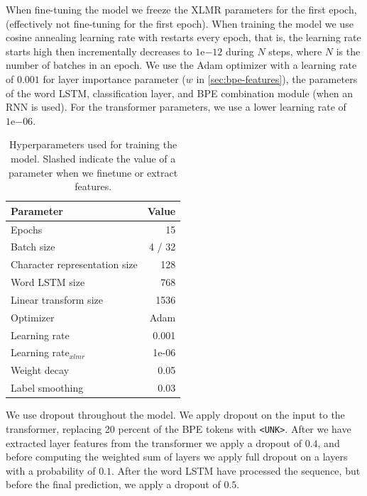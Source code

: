 \documentclass[11pt]{article}
\begin{document}
     When fine-tuning the model we freeze the XLMR parameters for the
     first epoch, (effectively not fine-tuning for the first epoch).
     When training the model we use cosine annealing learning rate
     with restarts every epoch, that is, the learning rate starts high
     then incrementally decreases to $1\mathrm{e}{-12}$ during $N$
     steps, where $N$ is the number of batches in an epoch. We use the
     Adam optimizer with a learning rate of $0.001$ for layer
     importance parameter ($w$ in \cref{sec:bpe-features}), the
     parameters of the word LSTM, classification layer, and BPE
     combination module (when an RNN is used). For the transformer
     parameters, we use a lower learning rate of $1\mathrm{e}{-06}$.

	\begin{table}%
		\centering
		\begin{tabular}{lr}
			Parameter & Value \\
			\hline
			Epochs & 15 \\
			Batch size & 4 / 32 \\
			Character representation size & 128 \\
            Word LSTM size & 768 \\
            Linear transform size & 1536 \\
			Optimizer & Adam \\
			Learning rate & 0.001 \\
			Learning rate$_{xlmr}$ & 1e-06 \\
            Weight decay & 0.05 \\
			Label smoothing & 0.03 \\
		\end{tabular}
		\caption{\label{tab:parameters} Hyperparameters used for training the model. Slashed indicate the value of a parameter when we finetune or extract features.}
	\end{table}

        We use dropout throughout the model. We apply dropout on the
        input to the transformer, replacing 20 percent of the BPE tokens
        with \texttt{<UNK>}. After we have extracted layer features
        from the transformer we apply a dropout of $0.4$, and before
        computing the weighted sum of layers we apply full dropout on
        a layers with a probability of $0.1$. After the word LSTM have
        processed the sequence, but before the final prediction, we
        apply a dropout of $0.5$.
\end{document}
